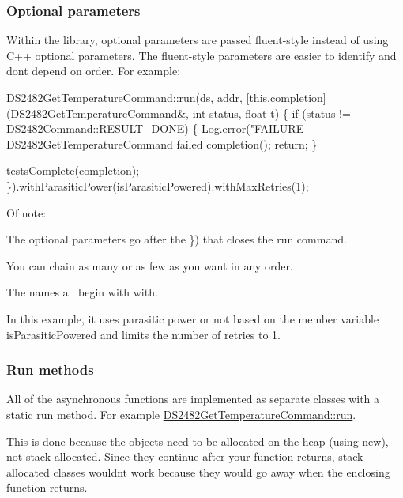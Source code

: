 \subsubsection*{Optional parameters}

Within the library, optional parameters are passed fluent-\/style instead of using C++ optional parameters. The fluent-\/style parameters are easier to identify and don\textquotesingle{}t depend on order. For example\+:


\begin{DoxyCode}
DS2482GetTemperatureCommand::run(ds, addr, [this,completion](DS2482GetTemperatureCommand&, int status,
       float t) \{
        if (status != DS2482Command::RESULT\_DONE) \{
            Log.error("FAILURE DS2482GetTemperatureCommand failed %
            completion();
            return;
        \}

        testsComplete(completion);
    \}).withParasiticPower(isParasiticPowered).withMaxRetries(1);
\end{DoxyCode}


Of note\+:


\begin{DoxyItemize}
\item The optional parameters go after the {\ttfamily \})} that closes the run command.
\item You can chain as many or as few as you want in any order.
\item The names all begin with {\ttfamily with}.
\end{DoxyItemize}

In this example, it uses parasitic power or not based on the member variable {\ttfamily is\+Parasitic\+Powered} and limits the number of retries to 1.

\subsubsection*{Run methods}

All of the asynchronous functions are implemented as separate classes with a static run method. For example {\ttfamily \mbox{\hyperlink{class_d_s2482_get_temperature_command_a91c9ee5048047d209e3dd1effa1ba179}{D\+S2482\+Get\+Temperature\+Command\+::run}}}.

This is done because the objects need to be allocated on the heap (using new), not stack allocated. Since they continue after your function returns, stack allocated classes wouldn\textquotesingle{}t work because they would go away when the enclosing function returns.


